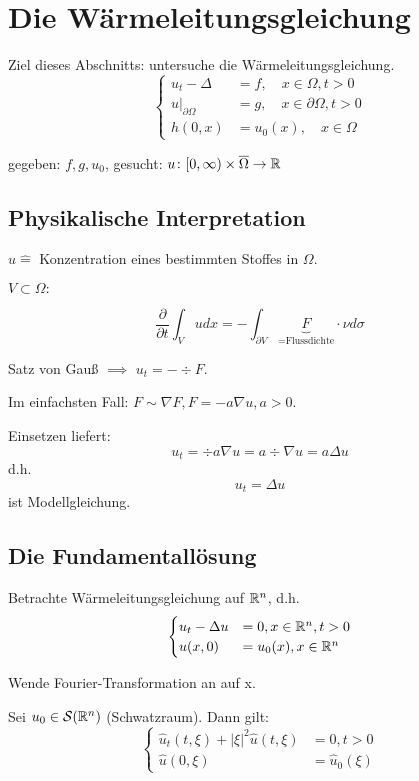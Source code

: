 \section{Die Wärmeleitungsgleichung}

Ziel dieses Abschnitts: untersuche die Wärmeleitungsgleichung.
$$
\begin{cases}
  u_t - \Delta &= f, \quad x \in \Omega, t > 0 \\
  u|_{\partial\Omega} &= g, \quad x \in \partial \Omega, t > 0 \\
  h(0,x) &= u_0(x), \quad x \in \Omega
\end{cases}
$$

gegeben: $f, g, u_0$, gesucht: $u \colon [0, \infty) \times \overline \Omega \to \mathbb{R}$

\subsection{Physikalische Interpretation}

$u \hat = $ Konzentration eines bestimmten Stoffes in $\Omega$.

$V \subset \Omega:$

$$
\frac{\partial}{\partial t} \int_V u dx = -\int_{\partial V} \underbrace{F}_{= \text{Flussdichte}} \cdot \nu d\sigma
$$

Satz von Gauß $\implies$ $u_t = -\div F$.

Im einfachsten Fall: $F \sim \nabla F, F = -a\nabla u, a > 0$.

Einsetzen liefert: 
$$
u_t = \div a \nabla u = a \div \nabla u = a \Delta u
$$
d.h.
$$
u_t = \Delta u
$$
ist Modellgleichung.
  
\subsection{Die Fundamentallösung}

Betrachte Wärmeleitungsgleichung auf $\mathbb{R}^n$, d.h.
$$
\begin{cases}
  u_t - \Delta u &= 0, x \in \mathbb{R}^n, t > 0 \\
  u(x,0) &= u_0(x), x \in \mathbb{R}^n
\end{cases}
$$

Wende Fourier-Transformation an auf x.

Sei $u_0 \in \mathcal{S}(\mathbb{R}^n)$ (Schwatzraum). Dann gilt:
$$
\begin{cases}
  \hat u_t(t, \xi) + |\xi|^2 \hat u (t, \xi) &= 0, t > 0 \\
  \hat u(0,\xi) &= \hat u_0 (\xi)
\end{cases}
$$

